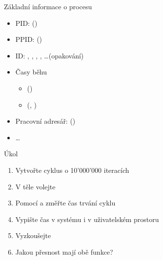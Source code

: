 \begin{frame}{Základní informace o procesu}

  \begin{itemize}
    \item PID:  ()
    \item PPID:  ()

    \pause

    \item ID: , , , ,
      \dots \ifpcdirlinux (opakování) \fi

    \pause

    \item Časy běhu
    \begin{itemize}
      \item {} ()
      \item {} (, )
    \end{itemize}

    \pause

    \item Pracovní adresář: 
      ()

    \item \dots
  \end{itemize}

\end{frame}

\ifpcdirlinuxb

\begin{frame}{Úkol}

  \begin{enumerate}
    \item Vytvořte cyklus o 10'000'000 iteracích
    \item V těle volejte 
    \item Pomocí  a  změřte čas trvání cyklu
    \item Vypište čas v systému i v uživatelském prostoru
    \item Vyzkoušejte
    \item Jakou přesnost mají obě funkce?
  \end{enumerate}

\end{frame}


